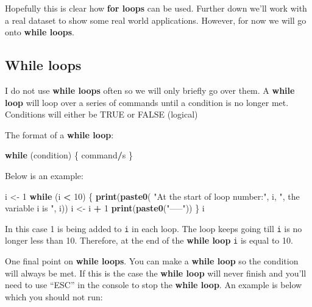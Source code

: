 \documentclass[]{book}
\newenvironment{Shaded}{\begin{snugshade}}{\end{snugshade}}
\newcommand{\KeywordTok}[1]{\textcolor[rgb]{0.13,0.29,0.53}{\textbf{#1}}}
\newcommand{\DecValTok}[1]{\textcolor[rgb]{0.00,0.00,0.81}{#1}}
\newcommand{\StringTok}[1]{\textcolor[rgb]{0.31,0.60,0.02}{#1}}
\newcommand{\ControlFlowTok}[1]{\textcolor[rgb]{0.13,0.29,0.53}{\textbf{#1}}}
\newcommand{\OperatorTok}[1]{\textcolor[rgb]{0.81,0.36,0.00}{\textbf{#1}}}
\newcommand{\NormalTok}[1]{#1}
\begin{document}
Hopefully this is clear how \textbf{for loops} can be used. Further down
we'll work with a real dataset to show some real world applications.
However, for now we will go onto \textbf{while loops}.

\subsection{While loops}\label{while-loops}

I do not use \textbf{while loops} often so we will only briefly go over
them. A \textbf{while loop} will loop over a series of commands until a
condition is no longer met. Conditions will either be TRUE or FALSE
(logical)

The format of a \textbf{while loop}:

\begin{Shaded}
\begin{Highlighting}[]
\ControlFlowTok{while}\NormalTok{ (condition) \{}
\NormalTok{  command}\OperatorTok{/}\NormalTok{s}
\NormalTok{\}}
\end{Highlighting}
\end{Shaded}

Below is an example:

\begin{Shaded}
\begin{Highlighting}[]
\NormalTok{i <-}\StringTok{ }\DecValTok{1}
\ControlFlowTok{while}\NormalTok{ (i }\OperatorTok{<}\StringTok{ }\DecValTok{10}\NormalTok{) \{}
  \KeywordTok{print}\NormalTok{(}\KeywordTok{paste0}\NormalTok{(}
    \StringTok{"At the start of loop number:"}\NormalTok{, i, }\StringTok{", the variable i is "}\NormalTok{, i))}
\NormalTok{  i <-}\StringTok{ }\NormalTok{i }\OperatorTok{+}\StringTok{ }\DecValTok{1}
  \KeywordTok{print}\NormalTok{(}\KeywordTok{paste0}\NormalTok{(}\StringTok{"-----"}\NormalTok{))}
\NormalTok{\}}
\NormalTok{i}
\end{Highlighting}
\end{Shaded}

In this case 1 is being added to \texttt{i} in each loop. The loop keeps
going till \texttt{i} is no longer less than 10. Therefore, at the end
of the \textbf{while loop} \texttt{i} is equal to 10.

One final point on \textbf{while loops}. You can make a \textbf{while
loop} so the condition will always be met. If this is the case the
\textbf{while loop} will never finish and you'll need to use ``ESC'' in
the console to stop the \textbf{while loop}. An example is below which
you should not run:
\end{document}
